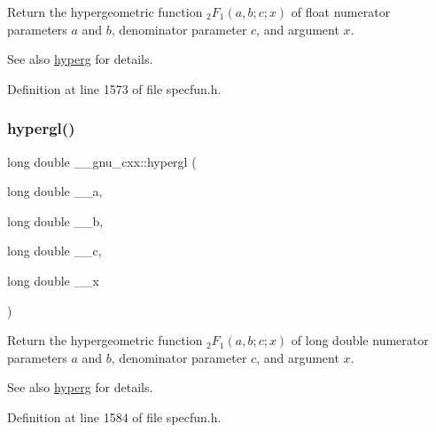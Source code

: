 Return the hypergeometric function $ {}_2F_1(a,b;c;x) $ of {\ttfamily float} numerator parameters $ a $ and $ b $, denominator parameter $ c $, and argument $ x $.

\begin{DoxySeeAlso}{See also}
\hyperlink{group__gnu__math__spec__func_ga374198e4076f9e23f3878ca3af70e6da}{hyperg} for details. 
\end{DoxySeeAlso}


Definition at line 1573 of file specfun.\+h.

\mbox{\label{group__gnu__math__spec__func_ga9961967087216e97f76283f29e1be152}} 
\subsubsection{\texorpdfstring{hypergl()}{hypergl()}}
{\footnotesize\ttfamily long double \+\_\+\+\_\+gnu\+\_\+cxx\+::hypergl (\begin{DoxyParamCaption}\item[{long double}]{\+\_\+\+\_\+a,  }\item[{long double}]{\+\_\+\+\_\+b,  }\item[{long double}]{\+\_\+\+\_\+c,  }\item[{long double}]{\+\_\+\+\_\+x }\end{DoxyParamCaption})\hspace{0.3cm}{\ttfamily [inline]}}

Return the hypergeometric function $ {}_2F_1(a,b;c;x) $ of {\ttfamily long double} numerator parameters $ a $ and $ b $, denominator parameter $ c $, and argument $ x $.

\begin{DoxySeeAlso}{See also}
\hyperlink{group__gnu__math__spec__func_ga374198e4076f9e23f3878ca3af70e6da}{hyperg} for details. 
\end{DoxySeeAlso}


Definition at line 1584 of file specfun.\+h.

\mbox{\label{group__gnu__math__spec__func_ga1fa9e260ba85fc043e3d2ada99c0143c}} 
